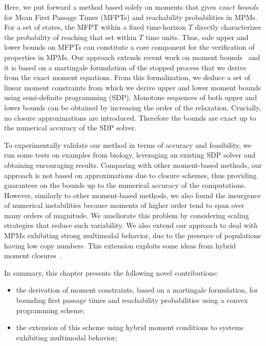 Here, we put forward a method based solely on moments that gives \emph{exact bounds}  for Mean First Passage Times (MFPTs) and reachability probabilities in MPMs. For a set of states, the MFPT within a fixed
time-horizon $T$  directly characterizes the probability of reaching that set
within $T$ time units. Thus, safe upper and lower bounds on MFPTs can constitute a core component for the verification of properties in MPMs.
Our approach extends recent work on moment
bounds~\cite{sakurai2017convex,dowdy2018dynamic} and it is based on a martingale formulation of the stopped process that we
derive from the exact moment equations. From this formalization, we deduce a set
of linear moment constraints from which we derive
upper and lower moment bounds using semi-definite programming (SDP). Monotone
sequences of both upper and lower bounds
can be obtained by increasing the order of the relaxation. Crucially, no
closure approximations are introduced.
Therefore the bounds are exact up to the numerical accuracy of the SDP solver.


To experimentally validate our method in terms of accuracy and feasibility, we run some tests on examples from biology, leveraging an existing SDP solver and obtaining encouraging results. 
Comparing with other moment-based methods, our approach is not based on approximations due to closure schemes, thus providing guarantees on the bounds   up to the numerical accuracy of the computations. However, similarly to other moment-based methods, we also found the insurgence of numerical instabilities because moments of higher order tend to span over many orders of magnitude. We ameliorate this problem by considering scaling strategies that reduce such variability. 
We also extend our approach to deal with MPMs exhibiting strong multimodal behavior, due to the presence of populations having low copy numbers. This extension exploits some ideas from hybrid moment closures~\cite{kazeroonian2014modeling}. 





\noindent
In summary, this chapter presents the following novel contributions:
\begin{itemize}
    \item the derivation of moment constraints, based on a martingale formulation, for bounding first passage times
      and reachability probabilities using a convex programming scheme;
    \item the extension of this scheme using hybrid moment conditions to systems
      exhibiting multimodal behavior;
\end{itemize}

